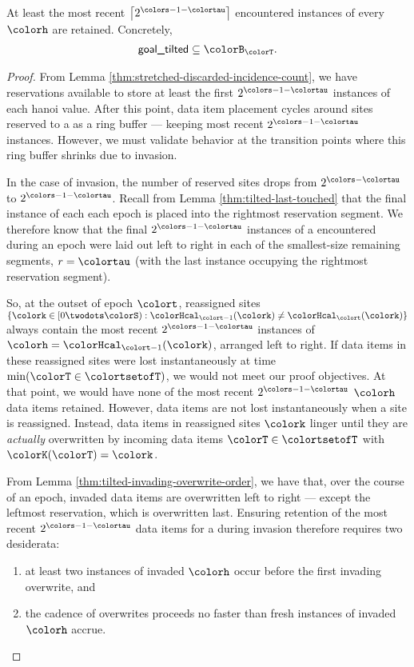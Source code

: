 \begin{lemma}
\label{thm:tilted-most-recent-retained}
At least the most recent $\left\lceil2^{\colors - 1 - \colortau}\right\rceil$ encountered instances of every \hv{} $\colorh$ are retained.
Concretely,
\begin{align*}
\textsf{goal\_tilted} \subseteq \colorB_{\colorT}.
\end{align*}
\end{lemma}
\begin{proof}
From Lemma \ref{thm:stretched-discarded-incidence-count}, we have reservations available to store at least the first $2^{\colors - 1 - \colortau}$ instances of each hanoi value.
After this point, data item placement cycles around sites reserved to a \hv as a ring buffer --- keeping most recent $2^{\colors - 1 - \colortau}$ instances.
However, we must validate behavior at the transition points where this ring buffer shrinks due to invasion.

In the case of invasion, the number of reserved sites drops from $2^{\colors - \colortau}$ to $2^{\colors - 1 - \colortau}$.
Recall from Lemma \ref{thm:tilted-last-touched} that the final instance of each \hv{} each epoch is placed into the rightmost reservation segment.
We therefore know that the final $2^{\colors - 1 - \colortau}$ instances of a \hv{} encountered during an epoch were laid out left to right in each of the smallest-size remaining segments, $r = \colortau$ (with the last instance occupying the rightmost reservation segment).

So, at the outset of epoch $\colort$, reassigned sites $\{\colork \in [0\twodots\colorS) : \colorHcal_{\colort - 1}(\colork) \neq \colorHcal_{\colort}(\colork)\}$ always contain the most recent $2^{\colors - 1 - \colortau}$ instances of \hv{} $\colorh = \colorHcal_{\colort - 1}(\colork)$, arranged left to right.
If data items in these reassigned sites were lost instantaneously at time $\min(\colorT \in \colortsetofT)$, we would not meet our proof objectives.
At that point, we would have none of the most recent $2^{\colors - 1 - \colortau}$ \hv{} $\colorh$ data items retained.
However, data items are not lost instantaneously when a site is reassigned.
Instead, data items in reassigned sites $\colork$ linger until they are \textit{actually} overwritten by incoming data items $\colorT \in \colortsetofT$ with $\colorK(\colorT) = \colork$.

From Lemma \ref{thm:tilted-invading-overwrite-order}, we have that, over the course of an epoch, invaded data items are overwritten left to right --- except the leftmost reservation, which is overwritten last.
Ensuring retention of the most recent $2^{\colors - 1 - \colortau}$ data items for a \hv{} during invasion therefore requires two desiderata:
\begin{enumerate}
\item at least two instances of invaded \hv{} $\colorh$ occur before the first invading overwrite, and
\item the cadence of overwrites proceeds no faster than fresh instances of invaded \hv{} $\colorh$ accrue.
\end{enumerate}



\end{proof}
